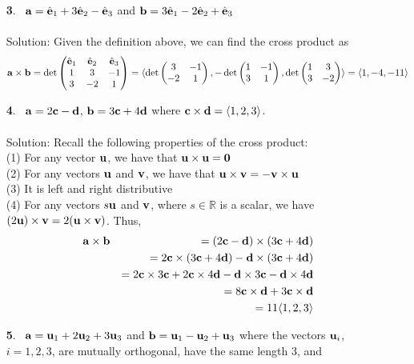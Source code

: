 \documentclass[12pt]{amsbook}
\newcommand{\la}{\langle}
\newcommand{\ra}{\rangle}
\begin{document}
\begin{enumerate}
\item[{\small\bf 3}.]\ ${\bf a}=\hat{\bf e}_1+ 3\hat{\bf e}_2- \hat{\bf e}_3$ and ${\bf
b}=3\hat{\bf e}_1- 2\hat{\bf e}_2+ \hat{\bf e}_3$
\\
\\
{\sc Solution}:
Given the definition above, we can find the cross product as
$${\bf a}\times{\bf b}=\det\begin{pmatrix} \hat{\bf e}_1 & \hat{\bf e}_2 & \hat{\bf e}_3\cr 1&3&-1\cr 3&-2&1 \cr \end{pmatrix}= \la \det\begin{pmatrix}
3&-1\cr -2&1\cr \end{pmatrix},-\det\begin{pmatrix} 1&-1\cr 3&1\cr \end{pmatrix},\det\begin{pmatrix} 1&3\cr 3&-2\cr  \end{pmatrix}\ra =\la 1,-4,-11 \ra $$
\item[{\small\bf 4}.]\
${\bf a}=2{\bf c}-{\bf d}$, ${\bf b}=3{\bf c}+4{\bf d}$
where ${\bf c}\times{\bf d}=\la1,2,3\ra$.
\\
\\
{\sc Solution}: Recall the following properties of the cross product:
\\
(1) For any vector $\bf u$, we have that ${\bf u}\times{\bf u}=\bf 0$ \\ (2) For any vectors $\bf u$ and $\bf v$, we have that ${\bf u}\times{\bf v}=-{\bf v}\times{\bf u}$ \\ (3) It is left and right distributive \\ (4) For any vectors $s\bf u$ and $\bf v$, where $s \in \mathbb{R}$ is a scalar, we have   
$({2\bf u)}\times{\bf v}=2({\bf u}\times{\bf v})$. Thus,
\begin{eqnarray*}
{\bf a}\times{\bf b}&&=(2{\bf c}-{\bf d})\times(3{\bf c}+4{\bf d})\\
&&=2{\bf c}\times(3{\bf c}+4{\bf d})-{\bf d}\times(3{\bf c}+4{\bf d})\\
&&=2{\bf c}\times 3{\bf c}+2{\bf c}\times 4{\bf d}-{\bf d}\times 3{\bf c}-{\bf d}\times 4{\bf d}\\
&&=8{\bf c}\times {\bf d}+3{\bf c}\times {\bf d}\\
&&=11\la 1,2,3 \ra
\end{eqnarray*}
\item[{\small\bf 5}.]\ ${\bf a}={\bf u}_1+2{\bf u}_2+3{\bf u}_3$ and 
${\bf b}={\bf u}_1-{\bf u}_2+{\bf u}_3$ where the vectors ${\bf u}_i$,
$i=1,2,3$, are mutually orthogonal, have the same length $3$, and 

\end{enumerate}
\end{document}
